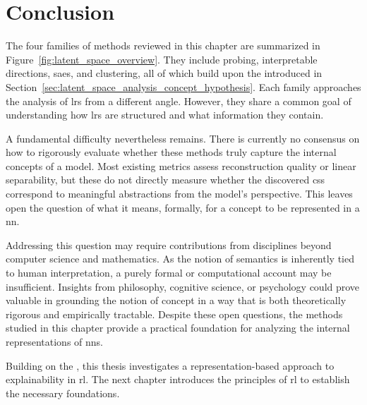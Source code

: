 \section{Conclusion}
\label{sec:latent_space_analysis_conclusion}



The four families of methods reviewed in this chapter are summarized in Figure~\ref{fig:latent_space_overview}.
They include probing, interpretable directions, \glspl{sae}, and clustering, all of which build upon the \ConceptHypothesisName introduced in Section~\ref{sec:latent_space_analysis_concept_hypothesis}.
Each family approaches the analysis of \glspl{lr} from a different angle.
However, they share a common goal of understanding how \glspl{lr} are structured and what information they contain.

A fundamental difficulty nevertheless remains.
There is currently no consensus on how to rigorously evaluate whether these methods truly capture the internal concepts of a model.
Most existing metrics assess reconstruction quality or linear separability, but these do not directly measure whether the discovered \glspl{cs} correspond to meaningful abstractions from the model's perspective.
This leaves open the question of what it means, formally, for a concept to be represented in a \gls{nn}.

Addressing this question may require contributions from disciplines beyond computer science and mathematics.
As the notion of semantics is inherently tied to human interpretation, a purely formal or computational account may be insufficient.
Insights from philosophy, cognitive science, or psychology could prove valuable in grounding the notion of concept in a way that is both theoretically rigorous and empirically tractable.
Despite these open questions, the methods studied in this chapter provide a practical foundation for analyzing the internal representations of \glspl{nn}.

Building on the \ConceptHypothesisName, this thesis investigates a representation-based approach to explainability in \gls{rl}.
The next chapter introduces the principles of \gls{rl} to establish the necessary foundations.